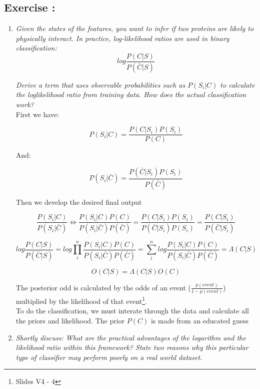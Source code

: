 \documentclass[10pt,a4paper]{article}
\newcommand{\exercise}[1]
{
  \stepcounter{subsection}
  \subsection*{Exercise \thesubsection: #1}

}
\begin{document}
\exercise{}
\begin{enumerate}

\item \textit{Given the states of the features, you want to infer if two proteins are likely to physically
	interact. In practice, log-likelihood ratios are used in binary classification:}\\

\[ 
	log\frac{P(C|S)}{P(\bar{C}|S)} 
\]

\textit{Derive a term that uses observable probabilities such as $ P(S_i|C) $ to calculate the loglikelihood
	ratio from training data. How does the actual classification work?}\\



First we have: 

\[ P(S_i | C) = \frac{P(C|S_i)P(S_i)}{P(C)} \]

And: 

\[ P(S_i | \bar{C}) = \frac{P(\bar{C}|S_i)P(S_i)}{P(\bar{C})} \]

Then we develop the desired final output

\[ \frac{P(S_i|C)}{P(S_i |\bar{C})}  \Longleftrightarrow \frac{P(S_i | C)P(C)}{P(S_i |\bar{C})P(\bar{C})} = \frac{P(C|S_i)P(S_i)}{P(\bar{C}|S_i)P(S_i)} = \frac{P(C|S_i )}{P(\bar{C}|S_i)}\]



\[ log\frac{P(C|S)}{P(\bar{C}|S)} = log \prod_{i}^{n} \frac{P(S_i | C)P(C)}{P(S_i |\bar{C})P(\bar{C})} = \sum_{i}^{n} log \frac{P(S_i | C)P(C)}{P(S_i |\bar{C})P(\bar{C})} = \Lambda(C|S) \]

\[ O(C|S) =  \Lambda(C|S) O(C)\]

The posterior odd is calculated by the odds of an event ($ \frac{p(event)}{1-p(event)}$) multiplied by the likelihood of that event\footnote{Slides V4 - 4}. \\

To do the classification, we must interate through the data and calculate all the priors and likelihood. The prior $P(C)$ is made from an educated guess 


\item \textit{Shortly discuss: What are the practical advantages of the logarithm and the likelihood ratio
	within this framework? State two reasons why this particular type of classifier may perform
	poorly on a real world dataset.}\\


\end{enumerate}
\end{document}
